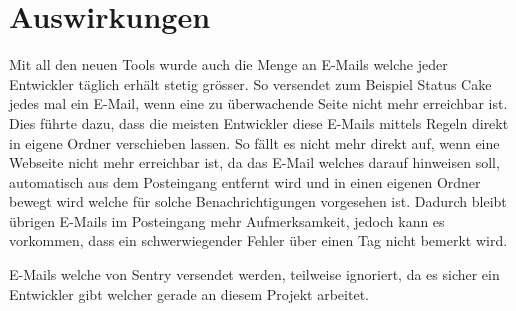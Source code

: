 \section{Auswirkungen}
\label{sec:auswirkungen}
Mit all den neuen Tools wurde auch die Menge an E-Mails welche jeder Entwickler täglich erhält stetig grösser. So versendet zum Beispiel Status Cake jedes mal ein E-Mail, wenn eine zu überwachende Seite nicht mehr erreichbar ist. Dies führte dazu, dass die meisten Entwickler diese E-Mails mittels Regeln direkt in eigene Ordner verschieben lassen. So fällt es nicht mehr direkt auf, wenn eine Webseite nicht mehr erreichbar ist, da das E-Mail welches darauf hinweisen soll, automatisch aus dem Posteingang entfernt wird und in einen eigenen Ordner bewegt wird welche für solche Benachrichtigungen vorgesehen ist. Dadurch bleibt übrigen E-Mails im Posteingang mehr Aufmerksamkeit, jedoch kann es vorkommen, dass ein schwerwiegender Fehler über einen Tag nicht bemerkt wird.

E-Mails welche von Sentry versendet werden, teilweise ignoriert, da es sicher ein Entwickler gibt welcher gerade an diesem Projekt arbeitet.